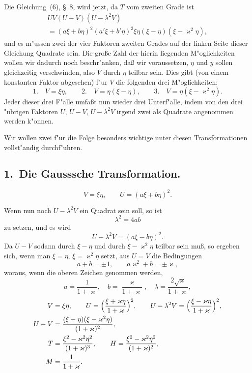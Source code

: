 \documentclass[12pt,a4paper]{article}
\theoremstyle{definition}
\begin{document}
Die Gleichung~(6), \S~8, wird jetzt, da $T$ vom zweiten Grade ist
\begin{multline}\tag{1}
UV(U-V)(U-\lambda^2V)\\
= (a\xi + b\eta)^2(a'\xi + b'\eta)^2\xi\eta(\xi-\eta)(\xi-\varkappa^2\eta),
\end{multline}
und es m"ussen zwei der vier Faktoren zweiten Grades auf der linken Seite dieser Gleichung Quadrate sein. Die gro\ss{}e Zahl der hierin liegenden M"oglichkeiten wollen wir dadurch noch beschr"anken, da\ss{}{} wir voraussetzen, $\eta$ und $y$ sollen gleichzeitig verschwinden, also $V$ durch $\eta$ teilbar sein. Dies gibt (von einem konstanten Faktor abgesehen) f"ur $V$ die folgenden drei M"oglichkeiten:
\[1.\quad V = \xi\eta,\qquad 2.\quad V = \eta(\xi-\eta),\qquad 3.\quad V = \eta(\xi-\varkappa^2\eta).
\]
Jeder dieser drei F"alle umfa\ss{}t nun wieder drei Unterf"alle, indem von den drei "ubrigen Faktoren $U$, $U-V$, $U-\lambda^2V$ irgend zwei als Quadrate angenommen werden k"onnen.

\newpage

Wir wollen zwei f"ur die Folge besonders wichtige unter diesen Transformationen vollst"andig durchf"uhren.

\subsection*{1.~Die Gausssche Transformation.}
\[V = \xi\eta,\qquad U = (a\xi + b\eta)^2.\]

Wenn nun noch $U - \lambda^2V$ ein Quadrat sein soll, so ist
\[\lambda^2 = 4ab
\]
zu setzen, und es wird
\[U - \lambda^2V = (a\xi - b\eta)^2.
\]
Da $U-V$ sodann durch $\xi-\eta$ und durch $\xi-\varkappa^2\eta$ teilbar sein mu\ss{}, so ergeben sich, wenn man $\xi = \eta$, $\xi = \varkappa^2\eta$ setzt, aus $U = V$ die Bedingungen
\[a + b = \pm 1,\qquad a\varkappa^2 + b = \pm\varkappa,
\]
woraus, wenn die oberen Zeichen genommen werden,
\[a = \frac{1}{1+\varkappa},\quad b = \frac{\varkappa}{1+\varkappa},\quad \lambda = \frac{2\sqrt{\varkappa}}{1+\varkappa},
\]
\begin{align*}
V &= \xi\eta,\qquad U = \Bigl(\frac{\xi + \varkappa\eta}{1+\varkappa}\Bigr)^2,\qquad U - \lambda^2V = \Bigl(\frac{\xi - \varkappa\eta}{1+\varkappa}\Bigr)^2,\\
U - V &= \frac{(\xi-\eta)(\xi-\varkappa^2\eta)}{(1+\varkappa)^2},\\
T &= \frac{\xi^2 - \varkappa^2\eta^2}{(1+\varkappa)^3},\qquad H = \frac{\xi^2 - \varkappa^2\eta^2}{(1+\varkappa)^2},\\
M &= \frac{1}{1+\varkappa}.
\end{align*}
\end{document}
